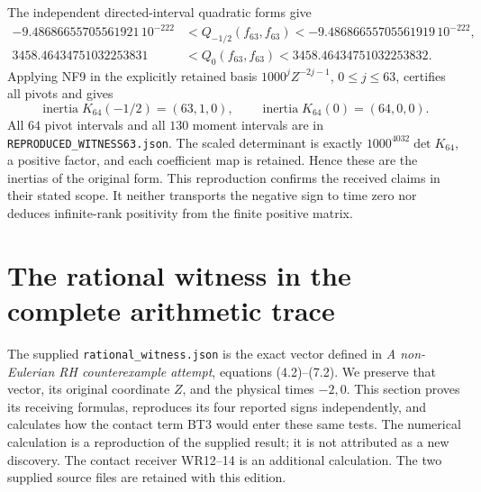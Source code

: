 \documentclass[11pt,a4paper]{article}
\theoremstyle{definition}\newtheorem{definition}[theorem]{Definition}
\begin{document}
The independent directed-interval quadratic forms give
\[
\begin{aligned}
-9.48686655705561921\,10^{-222}
 &<Q_{-1/2}(f_{63},f_{63})
 <-9.48686655705561919\,10^{-222},\\
3458.46434751032253831
 &<Q_0(f_{63},f_{63})
 <3458.46434751032253832.
\end{aligned}\tag{RPX6}
\]
Applying NF9 in the explicitly retained basis
$1000^jZ^{-2j-1}$, $0\le j\le63$, certifies all pivots and gives
\[
 \operatorname{inertia}K_{64}(-1/2)=(63,1,0),\qquad
 \operatorname{inertia}K_{64}(0)=(64,0,0).
 \tag{RPX7}
\]
All $64$ pivot intervals and all $130$ moment intervals are in
\texttt{REPRODUCED\_WITNESS63.json}. The scaled determinant
is exactly $1000^{4032}\det K_{64}$, a positive factor, and
each coefficient map is retained. Hence these are the inertias
of the original form. This reproduction confirms the received
claims in their stated scope. It neither transports the
negative sign to time zero nor deduces infinite-rank positivity
from the finite positive matrix.

\clearpage
\appendix
\section{The rational witness in the complete arithmetic trace}
\label{sec:witness-receiver}

The supplied \texttt{rational\_witness.json} is the exact vector
defined in \emph{A non-Eulerian RH counterexample attempt}, equations
(4.2)--(7.2). We preserve that vector, its original coordinate $Z$,
and the physical times $-2,0$. This section proves its receiving
formulas, reproduces its four reported signs independently, and
calculates how the contact term BT3 would enter these same tests.
The numerical calculation is a reproduction of the supplied result;
it is not attributed as a new discovery. The contact receiver WR12--14
is an additional calculation. The two supplied source files are
retained with this edition.
\end{document}
